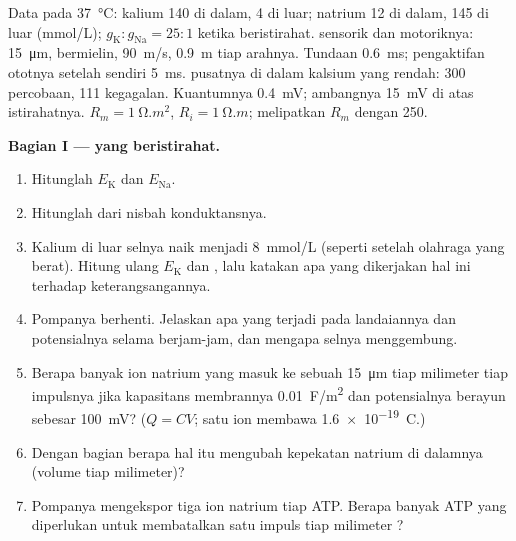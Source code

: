 \begin{problem}
\label{pb:b2:neurons-synapses:1}
Data pada \qty{37}{\celsius}: kalium 140 di dalam, 4 di luar; natrium
12 di dalam, 145 di luar (\unit{mmol/L}); $g_{\mathrm K} : g_{\mathrm{Na}} = 25 : 1$
ketika beristirahat.  sensorik dan motoriknya: \qty{15}{\micro m},
bermielin, \qty{90}{m/s}, \qty{0.9}{m} tiap arahnya. Tundaan
 \qty{0.6}{ms}; pengaktifan ototnya setelah  sendiri \qty{5}{ms}.  pusatnya di dalam kalsium yang
rendah: 300 percobaan, 111 kegagalan. Kuantumnya \qty{0.4}{mV};
ambangnya \qty{15}{mV} di atas istirahatnya. $R_m =
\qty{1}{\ohm.m^2}$, $R_i = \qty{1}{\ohm.m}$;  melipatkan $R_m$
dengan 250.

\medskip
\noindent\textbf{Bagian I ---  yang beristirahat.}
\begin{enumerate}
  \item Hitunglah $E_{\mathrm K}$ dan $E_{\mathrm{Na}}$.
  \item Hitunglah  dari nisbah konduktansnya.
  \item Kalium di luar selnya naik menjadi \qty{8}{mmol/L} (seperti
        setelah olahraga yang berat). Hitung ulang $E_{\mathrm K}$ dan
        , lalu katakan apa yang dikerjakan hal
        ini terhadap keterangsangannya.
  \item Pompanya berhenti. Jelaskan apa yang terjadi pada landaiannya
        dan potensialnya selama berjam-jam, dan mengapa selnya
        menggembung.
  \item Berapa banyak ion natrium yang masuk ke sebuah 
        \qty{15}{\micro m} tiap milimeter tiap impulsnya jika
        kapasitans membrannya \qty{0.01}{F/m^2} dan potensialnya
        berayun sebesar \qty{100}{mV}? ($Q = CV$; satu ion membawa
        \qty{1.6e-19}{C}.)
  \item Dengan bagian berapa hal itu mengubah kepekatan natrium di
        dalamnya (volume  tiap milimeter)?
  \item Pompanya mengekspor tiga ion natrium tiap ATP. Berapa banyak
        ATP yang diperlukan untuk membatalkan satu impuls tiap
        milimeter ?
\end{enumerate}


\end{problem}
